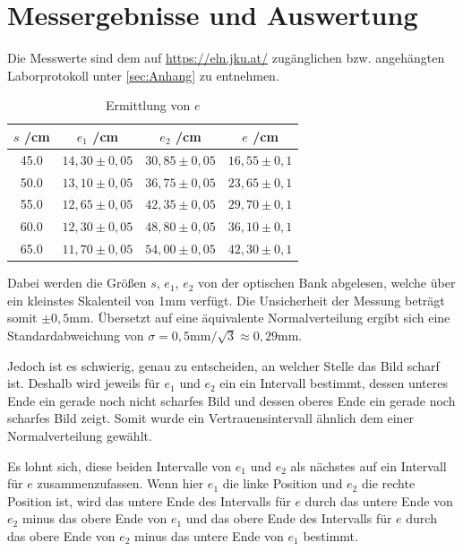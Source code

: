 \documentclass[a4paper,12pt]{article}
\begin{document}
\section{Messergebnisse und Auswertung}

Die Messwerte sind dem auf \url{https://eln.jku.at/} zugänglichen bzw. angehängten Laborprotokoll unter \ref{sec:Anhang} zu entnehmen.         %

\begin{table}[H]
	\centering
	\begin{tabular}{c|c|c|c}
		$s$ /cm & $e_1$ /cm & $e_2$ /cm & $e$ /cm \\ \hline
		45.0 & $14,30\pm0,05$ & $30,85\pm0,05$ & $16,55\pm0,1$ \\
		50.0 & $13,10\pm0,05$ & $36,75\pm0,05$ & $23,65\pm0,1$ \\
		55.0 & $12,65\pm0,05$ & $42,35\pm0,05$ & $29,70\pm0,1$ \\
		60.0 & $12,30\pm0,05$ & $48,80\pm0,05$ & $36,10\pm0,1$ \\
		65.0 & $11,70\pm0,05$ & $54,00\pm0,05$ & $42,30\pm0,1$ \\
	\end{tabular}
    \caption{Ermittlung von $e$}
\end{table}


Dabei werden die Größen $s$, $e_1$, $e_2$ von der optischen Bank abgelesen, welche über ein kleinstes Skalenteil
von 1mm verfügt. Die Unsicherheit der Messung beträgt somit $\pm 0,5\mathrm{mm}$. Übersetzt auf eine äquivalente
Normalverteilung ergibt sich eine Standardabweichung von $\sigma = 0,5\mathrm{mm} / \sqrt{3} \approx 0,29\mathrm{mm}$.

Jedoch ist es schwierig, genau zu entscheiden, an welcher Stelle das Bild scharf ist. Deshalb wird jeweils für $e_1$
und $e_2$ ein ein Intervall bestimmt, dessen unteres Ende ein gerade noch nicht scharfes Bild und dessen oberes
Ende ein gerade noch scharfes Bild zeigt. Somit wurde ein Vertrauensintervall ähnlich dem einer Normalverteilung
gewählt.

Es lohnt sich, diese beiden Intervalle von $e_1$ und $e_2$ als nächstes auf ein Intervall für $e$ zusammenzufassen.
Wenn hier $e_1$ die linke Position und $e_2$ die rechte Position ist, wird das untere Ende des Intervalls für $e$
durch das untere Ende von $e_2$ minus das obere Ende von $e_1$ und das obere Ende des Intervalls für $e$ durch
das obere Ende von $e_2$ minus das untere Ende von $e_1$ bestimmt. %
\end{document}
